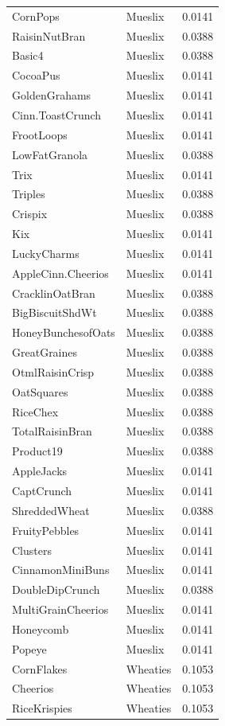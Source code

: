 \begin{table}[!htbp]
\begin{tabular}{lll}
CornPops & Mueslix & 0.0141
\\
RaisinNutBran & Mueslix & 0.0388
\\
Basic4 & Mueslix & 0.0388
\\
CocoaPus & Mueslix & 0.0141
\\
GoldenGrahams & Mueslix & 0.0141
\\
Cinn.ToastCrunch & Mueslix & 0.0141
\\
FrootLoops & Mueslix & 0.0141
\\
LowFatGranola & Mueslix & 0.0388
\\
Trix & Mueslix & 0.0141
\\
Triples & Mueslix & 0.0388
\\
Crispix & Mueslix & 0.0388
\\
Kix & Mueslix & 0.0141
\\
LuckyCharms & Mueslix & 0.0141
\\
AppleCinn.Cheerios & Mueslix & 0.0141
\\
CracklinOatBran & Mueslix & 0.0388
\\
BigBiscuitShdWt & Mueslix & 0.0388
\\
HoneyBunchesofOats & Mueslix & 0.0388
\\
GreatGraines & Mueslix & 0.0388
\\
OtmlRaisinCrisp & Mueslix & 0.0388
\\
OatSquares & Mueslix & 0.0388
\\
RiceChex & Mueslix & 0.0388
\\
TotalRaisinBran & Mueslix & 0.0388
\\
Product19 & Mueslix & 0.0388
\\
AppleJacks & Mueslix & 0.0141
\\
CaptCrunch & Mueslix & 0.0141
\\
ShreddedWheat & Mueslix & 0.0388
\\
FruityPebbles & Mueslix & 0.0141
\\
Clusters & Mueslix & 0.0141
\\
CinnamonMiniBuns & Mueslix & 0.0141
\\
DoubleDipCrunch & Mueslix & 0.0388
\\
MultiGrainCheerios & Mueslix & 0.0141
\\
Honeycomb & Mueslix & 0.0141
\\
Popeye & Mueslix & 0.0141
\\
CornFlakes & Wheaties & 0.1053
\\
Cheerios & Wheaties & 0.1053
\\
RiceKrispies & Wheaties & 0.1053

\end{tabular}
\end{table}
